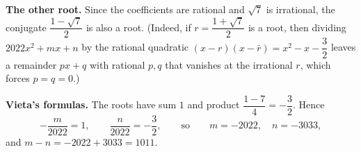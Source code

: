 \textbf{The other root.} Since the coefficients are rational and $\sqrt7$ is irrational, the conjugate $\dfrac{1-\sqrt7}{2}$ is also a root. (Indeed, if $r=\dfrac{1+\sqrt7}{2}$ is a root, then dividing $2022x^2+mx+n$ by the rational quadratic $(x-r)\left(x-\bar r\right)=x^2-x-\dfrac{3}{2}$ leaves a remainder $px+q$ with rational $p,q$ that vanishes at the irrational $r$, which forces $p=q=0$.)

\textbf{Vieta's formulas.} The roots have sum $1$ and product $\dfrac{1-7}{4}=-\dfrac{3}{2}$. Hence
\[
-\dfrac{m}{2022}=1,\qquad\dfrac{n}{2022}=-\dfrac{3}{2},\qquad\text{so}\qquad m=-2022,\quad n=-3033 ,
\]
and $m-n=-2022+3033=\boxed{1011}$.
